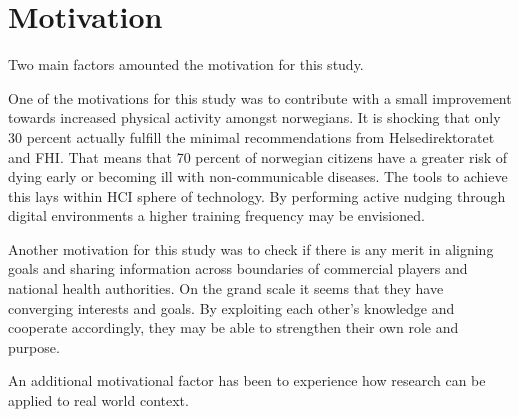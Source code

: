 \chapter*{Motivation} 
Two main factors amounted the motivation for this study. 

One of the motivations for this study was to contribute with a small improvement towards increased physical activity amongst norwegians. It is shocking that only 30 percent actually fulfill the minimal recommendations from Helsedirektoratet and FHI. That means that 70 percent of norwegian citizens have a greater risk of dying early or becoming ill with non-communicable diseases. The tools to achieve this lays within HCI sphere of technology. By performing active nudging through digital environments a higher training frequency may be envisioned. 

Another motivation for this study was to check if there is any merit in aligning goals and sharing information across boundaries of commercial players and national health authorities. On the grand scale it seems that they have converging interests and goals. By exploiting  each other's knowledge and cooperate accordingly, they may be able to strengthen their own role and purpose. 

An additional motivational factor has been to experience how research can be applied to real world context. 



